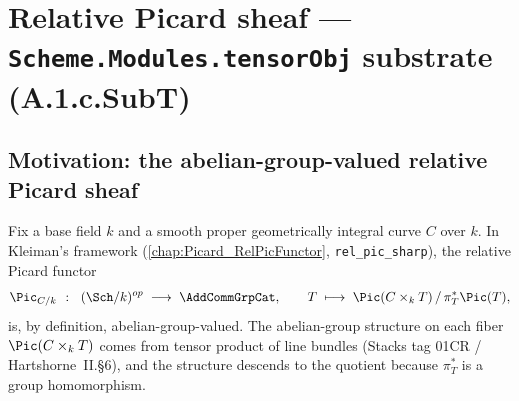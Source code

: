 \chapter{Relative Picard sheaf --- \texttt{Scheme.Modules.tensorObj} substrate (A.1.c.SubT)}
\label{chap:Picard_TensorObjSubstrate}

\section{Motivation: the abelian-group-valued relative Picard sheaf}
\label{sec:tensorobj_motivation}

Fix a base field \(k\) and a smooth proper geometrically integral curve \(C\) over
\(k\). In Kleiman's framework (\cref{chap:Picard_RelPicFunctor},
\texttt{rel\_pic\_sharp}), the relative Picard functor
\[
  \Pic_{C/k} \;\;\colon\;\; (\Sch/k)^{op} \;\longrightarrow\; \AddCommGrpCat,
  \qquad
  T \;\longmapsto\; \Pic(C \times_k T) \, / \, \pi_T^* \Pic(T),
\]
is, by definition, abelian-group-valued. The abelian-group structure on each
fiber \(\Pic(C \times_k T)\) comes from tensor product of line bundles
(Stacks tag 01CR / Hartshorne~II.\S 6), and the structure descends to the
quotient because \(\pi_T^*\) is a group homomorphism.

